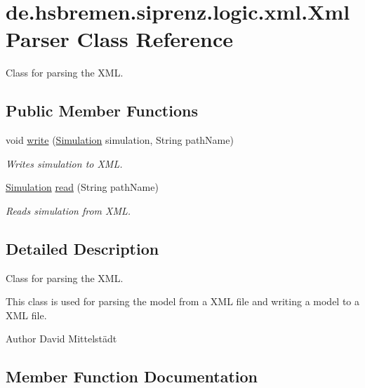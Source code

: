 \hypertarget{classde_1_1hsbremen_1_1siprenz_1_1logic_1_1xml_1_1XmlParser}{}\section{de.\+hsbremen.\+siprenz.\+logic.\+xml.\+Xml\+Parser Class Reference}
\label{classde_1_1hsbremen_1_1siprenz_1_1logic_1_1xml_1_1XmlParser}


Class for parsing the X\+ML.  


\subsection*{Public Member Functions}
\begin{DoxyCompactItemize}
\item 
void \hyperlink{classde_1_1hsbremen_1_1siprenz_1_1logic_1_1xml_1_1XmlParser_ac45ff895eebf7ad76196917c92eb03c8}{write} (\hyperlink{classde_1_1hsbremen_1_1siprenz_1_1model_1_1xml_1_1Simulation}{Simulation} simulation, String path\+Name)
\begin{DoxyCompactList}\small\item\em Writes simulation to X\+ML. \end{DoxyCompactList}\item 
\hyperlink{classde_1_1hsbremen_1_1siprenz_1_1model_1_1xml_1_1Simulation}{Simulation} \hyperlink{classde_1_1hsbremen_1_1siprenz_1_1logic_1_1xml_1_1XmlParser_a1847162a8559bae6b4cccc30fd86c989}{read} (String path\+Name)
\begin{DoxyCompactList}\small\item\em Reads simulation from X\+ML. \end{DoxyCompactList}\end{DoxyCompactItemize}


\subsection{Detailed Description}
Class for parsing the X\+ML. 

This class is used for parsing the model from a X\+ML file and writing a model to a X\+ML file.

\begin{DoxyAuthor}{Author}
David Mittelstädt 
\end{DoxyAuthor}


\subsection{Member Function Documentation}
